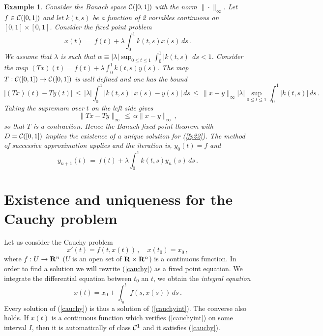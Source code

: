 \documentclass[12pt]{report}
\newcommand{\calC}{{\cal C}}
\newcommand{\bR}{{\bf R}}
\newtheorem{example}[theorem]{Example}
\def\eqref#1{(\ref{#1})}
\def\to{\rightarrow}
\begin{document}
\begin{example}{\rm   
Consider the Banach space $\calC([0,1])$ with the norm $\| \cdot
\|_\infty$. Let $f \in \calC([0,1])$ and let  $k(t,s)$ be a function of 
2 variables continuous on $[0,1] \times [0,1]$.  
Consider the fixed point problem
\begin{equation}\label{fp22}
x(t) \,=\, f(t)+ \lambda \int_0^1 k(t,s) x(s)\, ds \,.
\end{equation}
We assume that $\lambda$ is such that $\alpha \equiv
|\lambda| \sup_{0\le t\le 1} \int_0^1 |k(t,s)| \, ds <1$. Consider the
map $(Tx)(t) = f(t) + \lambda \int_0^1 k(t,s) y(s)$. The map $T: 
\calC([0,1]) \to \calC([0,1])$ is well defined and one has the bound 
\begin{equation}
|(Tx)(t) -Ty(t)| \, \le \, |\lambda| \int_0^1 |k(t,s)| |x(s)-y(s)| \, ds 
\,\le\, 
\|x -y\|_\infty |\lambda| \sup_{0\le t\le 1} \int_0^1 |k(t,s)| \, ds \,.
\end{equation}
Taking the supremum over $t$ on the left side gives
\begin{equation}\label{qs1}
\|Tx -Ty\|_\infty \,\le\, \alpha \|x-y\|_\infty \,,
\end{equation}
so that $T$ is a contraction. 
Hence the Banach fixed point theorem with $D=\calC([0,1])$
implies the existence of a unique solution for \eqref{fp22}.  
The method of successive approximation applies and the iteration is, 
$y_0(t)= f $ and
\begin{equation} 
y_{n+1}(t) \,=\,f(t) + \lambda \int_0^1 k(t,s) y_n(s)\, ds \,.
\end{equation}
}
\end{example}
  
  
\section{Existence and uniqueness for the Cauchy problem}  
Let us consider the Cauchy problem
 \begin{equation}\label{cauchy}
 x'(t)=f(t,x(t)) \,, \quad x(t_0) = x_0\,, 
\end{equation}
where $f : U \to \bR^n$ ($U$ is an open set of $\bR \times \bR^n$) is a
continuous function.  In order to find a solution we will rewrite
\eqref{cauchy} as a fixed point equation. We integrate the
differential equation between $t_0$ an $t$, we obtain the {\em
integral equation}
\begin{equation}\label{cauchyint}
 x(t) = x_0 + \int_{t_0}^t f( s, x(s)) \, ds \,.
 \end{equation}
Every solution of \eqref{cauchy} is thus a solution of
\eqref{cauchyint}. The converse also holds. If $x(t)$ is a continuous
function which verifies \eqref{cauchyint} on some interval $I$, then
it is automatically of class $\calC^1$ and it satisfies
\eqref{cauchy}.
\end{document}
